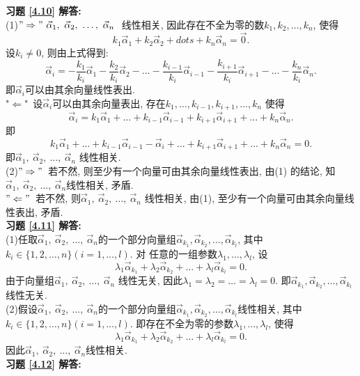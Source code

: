 \documentclass[a4paper]{book}
\begin{document}
\textbf{习题 \ref{4.10} 解答:}\\
(1)$"\Rightarrow"\  \vec{\alpha}_1, \ \vec{\alpha}_2, \ \dots,\ \vec{\alpha}_n\ $ 线性相关, 因此存在不全为零的数$k_1,k_2,\dots,k_n$, 使得
$$k_1\vec{\alpha}_1+k_2\vec{\alpha}_2+dots+k_n\vec{\alpha}_n=\vec{0}.$$
设$k_i\not=0 $, 则由上式得到:$$\vec{\alpha}_i=-\frac{k_1}{k_i}\vec{\alpha}_1-\frac{k_2}{k_i}\vec{\alpha}_2-\dots-\frac{k_{i-1}}{k_i}\vec{\alpha}_{i-1}-\frac{k_{i+1}}{k_i}\vec{\alpha}_{
i+1}-\dots-\frac{k_n}{k_i}\vec{\alpha}_n.$$
即$\vec{\alpha}_i$可以由其余向量线性表出.\\
"$\Leftarrow$"\ 设$\vec{\alpha}_i$可以由其余向量表出, 存在$k_1,\dots,k_{i-1},k_{i+1},\dots,k_n$ 使得$$\vec{\alpha}_i=k_1\vec{\alpha}_1+\dots+k_{i-1}\vec{\alpha}_{i-1}+k_{i+1}\vec{\alpha}_{i+1}+\dots+k_{n}\vec{\alpha}_{n}.$$ 即$$
k_1\vec{\alpha}_1+\dots+k_{i-1}\vec{\alpha}_{i-1}-\vec{\alpha}_i+\dots+k_{i+1}\vec{\alpha}_{i+1}+\dots+k_{n}\vec{\alpha}_{n}=0.$$
即$\vec{\alpha}_1, \ \vec{\alpha}_2, \ \dots,\ \vec{\alpha}_n$ 线性相关.\\
(2)$"\Rightarrow"$\ 若不然, 则至少有一个向量可由其余向量线性表出, 由(1) 的结论, 知$\vec{\alpha}_1, \ \vec{\alpha}_2, \ \dots,\ \vec{\alpha}_n$线性相关, 矛盾.\\
$"\Leftarrow"$\ 若不然, 则$\vec{\alpha}_1, \ \vec{\alpha}_2, \ \dots,\ \vec{\alpha}_n$ 线性相关, 由(1), 至少有一个向量可由其余向量线性表出, 矛盾.\\
\textbf{习题 \ref{4.11} 解答:}\\
(1)任取$\vec{\alpha}_1, \ \vec{\alpha}_2, \ \dots,\ \vec{\alpha}_n$的一个部分向量组$\vec{\alpha}_{k_1}, \vec{\alpha}_{k_2}, \dots, \vec{\alpha}_{k_l}$, 其中$k_i\in\{1,2,\dots,n\}(i=1,\dots,l)$. 对
任意的一组参数$\lambda_1,\dots,\lambda_l$, 设
$$\lambda_1\vec{\alpha}_{k_1}+\lambda_2\vec{\alpha}_{k_2}+\dots+\lambda_l\vec{\alpha}_{k_l}=0.$$
由于向量组$\vec{\alpha}_1, \ \vec{\alpha}_2, \ \dots,\ \vec{\alpha}_n$ 线性无关, 因此$\lambda_1=\lambda_2=\dots=\lambda_l=0$. 即$\vec{\alpha}_{k_1}, \vec{\alpha}_{k_2}, \dots, \vec{\alpha}_{k_l}$ 线性无关.\\
(2)假设$\vec{\alpha}_1, \ \vec{\alpha}_2, \ \dots,\ \vec{\alpha}_n$的一个部分向量组$\vec{\alpha}_{k_1}, \vec{\alpha}_{k_2}, \dots, \vec{\alpha}_{k_l}$线性相关,
其中$k_i\in\{1,2,\dots,n\}(i=1,\dots,l)$. 即存在不全为零的参数$\lambda_1,\dots,\lambda_l$,
使得$$\lambda_1\vec{\alpha}_{k_1}+\lambda_2\vec{\alpha}_{k_2}+\dots+\lambda_l\vec{\alpha}_{k_l}=0.$$
因此$\vec{\alpha}_1, \ \vec{\alpha}_2, \ \dots,\ \vec{\alpha}_n$线性相关.\\
\textbf{习题 \ref{4.12} 解答:}\\
\end{document}
